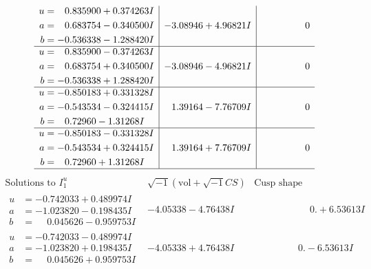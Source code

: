\documentclass[1p]{elsarticle_modified}
\theoremstyle{definition}
\newcommand{\I}{\sqrt{-1}}
\begin{document}
$$\begin{array}{c|c|c}
\begin{aligned}
u &= \phantom{-}0.835900 + 0.374263 I \\
a &= \phantom{-}0.683754 - 0.340500 I \\
b &= -0.536338 - 1.288420 I\end{aligned}
 & -3.08946 + 4.96821 I & \phantom{-0.000000 } 0 \\ \hline\begin{aligned}
u &= \phantom{-}0.835900 - 0.374263 I \\
a &= \phantom{-}0.683754 + 0.340500 I \\
b &= -0.536338 + 1.288420 I\end{aligned}
 & -3.08946 - 4.96821 I & \phantom{-0.000000 } 0 \\ \hline\begin{aligned}
u &= -0.850183 + 0.331328 I \\
a &= -0.543534 - 0.324415 I \\
b &= \phantom{-}0.72960 - 1.31268 I\end{aligned}
 & \phantom{-}1.39164 - 7.76709 I & \phantom{-0.000000 } 0 \\ \hline\begin{aligned}
u &= -0.850183 - 0.331328 I \\
a &= -0.543534 + 0.324415 I \\
b &= \phantom{-}0.72960 + 1.31268 I\end{aligned}
 & \phantom{-}1.39164 + 7.76709 I & \phantom{-0.000000 } 0\\
 \hline 
 \end{array}$$\newpage$$\begin{array}{c|c|c}  
\text{Solutions to }I^u_{1}& \I (\text{vol} + \sqrt{-1}CS) & \text{Cusp shape}\\
 \hline 
\begin{aligned}
u &= -0.742033 + 0.489974 I \\
a &= -1.023820 - 0.198435 I \\
b &= \phantom{-}0.045626 - 0.959753 I\end{aligned}
 & -4.05338 - 4.76438 I & \phantom{-0.000000 -}0. + 6.53613 I \\ \hline\begin{aligned}
u &= -0.742033 - 0.489974 I \\
a &= -1.023820 + 0.198435 I \\
b &= \phantom{-}0.045626 + 0.959753 I\end{aligned}
 & -4.05338 + 4.76438 I & \phantom{-0.000000 } 0. - 6.53613 I \\ \hline\begin{aligned}

\end{aligned}
\end{array}$$
\end{document}
